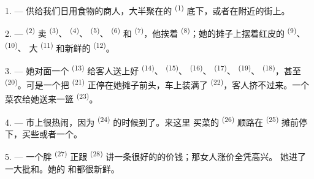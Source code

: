 
\VUsaut{4.0mm}
\VUsaut{3.0mm}

\VUsaut{3.0mm}

1. --- 供给我们日用食物的商人，大半聚在的
\textsuperscript{(1)} 底下，或者在附近的街上。

2. ---  \textsuperscript{(2)} 卖 \textsuperscript{(3)}、
 \textsuperscript{(4)}、 \textsuperscript{(5)}、
 \textsuperscript{(6)} 和 \textsuperscript{(7)}，他挨着
 \textsuperscript{(8)}；她的摊子上摆着红皮的
 \textsuperscript{(9)}、 \textsuperscript{(10)}、
大 \textsuperscript{(11)} 和新鲜的
\textsuperscript{(12)}。

3. --- 她对面一个 \textsuperscript{(13)} 给客人送上好
 \textsuperscript{(14)}、 \textsuperscript{(15)}、
 \textsuperscript{(16)}、 \textsuperscript{(17)}、
 \textsuperscript{(19)}、 \textsuperscript{(18)}，甚至
 \textsuperscript{(20)}。可是一个把
 \textsuperscript{(21)} 正停在她摊子前头，车上装满了
\textsuperscript{(22)}，客人挤不过来。一个菜农给她送来一篮 \textsuperscript{(23)}。

\VUsaut{4.0mm}
\VUsaut{3.0mm}

4. --- 市上很热闹，因为 \textsuperscript{(24)} 的时候到了。来这里
买菜的 \textsuperscript{(26)} 顺路在
\textsuperscript{(25)} 摊前停下，买些或者一个。

5. --- 一个胖 \textsuperscript{(27)} 正跟
\textsuperscript{(28)} 讲一条很好的的价钱；那女人涨价全凭高兴。
她进了一大批和。她的
和都很新鲜。


